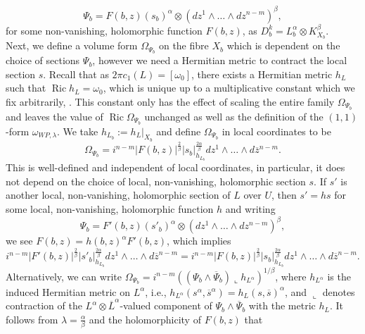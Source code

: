 \documentclass[12pt]{article}
\numberwithin{equation}{section}
\DeclareMathOperator{\Ric}{Ric}
\newcommand{\oo}[1]{\overline{#1}}
\begin{document}
\begin{equation*}
    \Psi_b = F(b,z) (s_b)^\alpha \otimes (dz^1 \wedge \dots \wedge dz^{n-m})^{\beta},
\end{equation*}
for some non-vanishing, holomorphic function $F(b,z)$, as $D^k_b = L^\alpha_b \otimes K_{X_b}^\beta$.\\
Next, we define a volume form $\Omega_{\Psi_b}$ on the fibre $X_b$ which is dependent on the choice of sections $\Psi_b$, however we need a Hermitian metric to contract the local section $s$. 
Recall that as $2\pi c_1(L) = [\omega_0]$, there exists a Hermitian metric $h_L$ such that $\Ric h_L = \omega_0$, which is unique up to a multiplicative constant which we fix arbitrarily, \cite[pg. 148]{GH94}. This constant only has the effect of scaling the entire family $\Omega_{\Psi_b}$ and leaves the value of $\Ric \Omega_{\Psi_b}$ unchanged as well as the definition of the $(1,1)$-form $\omega_{WP,\lambda}$. We take $h_{L_b} := h_L|_{X_b}$ and define $\Omega_{\Psi_b}$ in local coordinates to be
\begin{equation*}
    \Omega_{\Psi_b} = i^{n-m} |F(b,z)|^{\frac{2}{\beta}} |s_b|_{h_{L_b}}^{\frac{2\alpha}{\beta}} dz^1 \wedge \dots \wedge d\oo{z}^{n-m}.
\end{equation*}
This is well-defined and independent of local coordinates, in particular, it does not depend on the choice of local, non-vanishing, holomorphic section $s$. If $s'$ is another local, non-vanishing, holomorphic section of $L$ over $U$, then $s' = hs$ for some local, non-vanishing, holomorphic function $h$ and writing
\begin{equation*}
    \Psi_b = F'(b,z) (s'_b)^\alpha \otimes (dz^1 \wedge \dots \wedge dz^{n-m})^\beta,
\end{equation*}
we see $F(b,z) = h(b,z)^\alpha F'(b,z)$, which implies
\begin{equation*}
    i^{n-m}|F'(b,z)|^{\frac{2}{\beta}}|s'_b|_{h_{L_b}}^{\frac{2\alpha}{\beta}} dz^1 \wedge \dots \wedge d\oo{z}^{n-m} = i^{n-m}|F(b,z)|^{\frac{2}{\beta}}|s_b|_{h_{L_b}}^{\frac{2\alpha}{\beta}} dz^1 \wedge \dots \wedge d\oo{z}^{n-m}.
\end{equation*}
Alternatively, we can write $\Omega_{\Psi_b} = i^{n-m}((\Psi_b \wedge \oo{\Psi}_b) \llcorner h_{L^{\alpha}})^{1/\beta}$, where $h_{L^{\alpha}}$ is the induced Hermitian metric on $L^\alpha$, i.e., $h_{L^{\alpha}}(s^\alpha, \oo{s}^\alpha) = h_{L}(s,\oo{s})^\alpha$, and $\llcorner$ denotes contraction of the $L^\alpha \otimes \oo{L}^\alpha$-valued component of $\Psi_b \wedge \oo{\Psi}_b$ with the metric $h_{L}$. It follows from $\lambda = \frac{\alpha}{\beta}$ and the holomorphicity of $F(b,z)$ that
\end{document}
